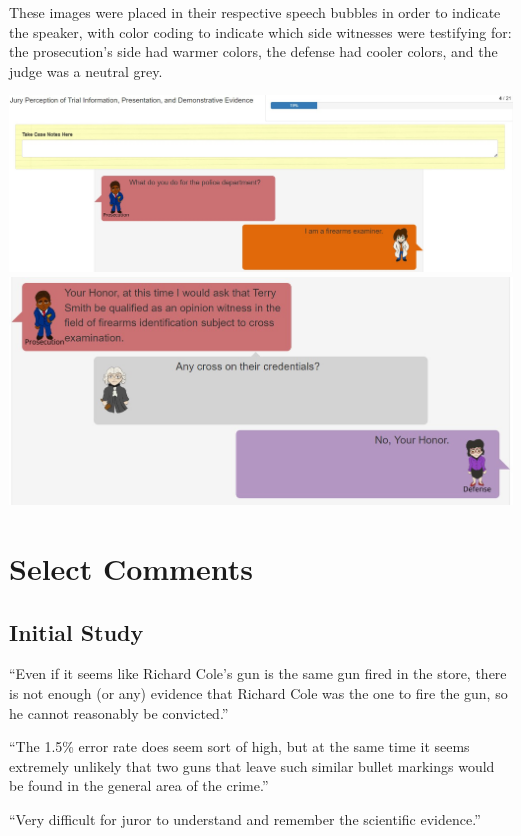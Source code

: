 \documentclass[print]{nuthesis}
\begin{document}
These images were placed in their respective speech bubbles in order to indicate the speaker, with color coding to indicate which side witnesses were testifying for: the prosecution's side had warmer colors, the defense had cooler colors, and the judge was a neutral grey.

\includegraphics[width=\linewidth]{images/Study2_Screenshot}
\includegraphics[width=\linewidth]{images/Study2_Screenshot2}

\hypertarget{select-comments}{%
\chapter{Select Comments}\label{select-comments}}

\hypertarget{initial-study}{%
\section{Initial Study}\label{initial-study}}

``Even if it seems like Richard Cole's gun is the same gun fired in the store, there is not enough (or any) evidence that Richard Cole was the one to fire the gun, so he cannot reasonably be convicted.''

``The 1.5\% error rate does seem sort of high, but at the same time it seems extremely unlikely that two guns that leave such similar bullet markings would be found in the general area of the crime.''

``Very difficult for juror to understand and remember the scientific evidence.''
\end{document}
